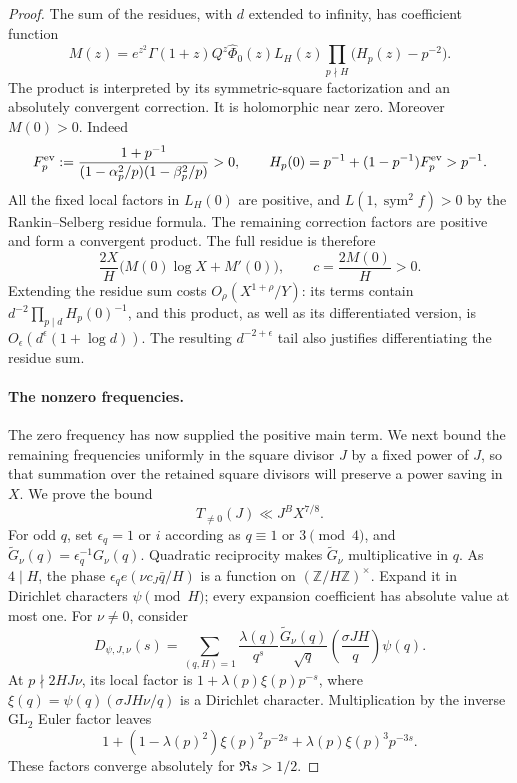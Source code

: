 \begin{proof}
The sum of the residues, with $d$ extended to infinity, has coefficient
function
\[
 M(z)=e^{z^2}\Gamma(1+z)Q^z\widehat\Phi_0(z)L_H(z)
              \prod_{p\nmid H}\bigl(H_p(z)-p^{-2}\bigr).
\]
The product is interpreted by its symmetric-square factorization and
an absolutely convergent correction.  It is holomorphic near zero.
Moreover $M(0)>0$.  Indeed
\[
 F_p^{\rm ev}:=\frac{1+p^{-1}}
 {(1-\alpha_p^2/p)(1-\beta_p^2/p)}>0,\qquad
 H_p(0)=p^{-1}+(1-p^{-1})F_p^{\rm ev}>p^{-1}.
\]
All the fixed local factors in $L_H(0)$ are positive, and
$L(1,\operatorname{sym}^2 f)>0$ by the Rankin--Selberg residue formula.
The remaining correction factors are positive and form a convergent
product.  The full residue is therefore
\begin{equation}\label{odd:residue}
 \frac{2X}{H}\bigl(M(0)\log X+M'(0)\bigr),
 \qquad c=\frac{2M(0)}H>0.
\end{equation}
Extending the residue sum costs $O_\rho(X^{1+\rho}/Y)$:
its terms contain $d^{-2}\prod_{p\mid d}H_p(0)^{-1}$, and this
product, as well as its differentiated version, is
$O_\epsilon(d^\epsilon(1+\log d))$.
The resulting $d^{-2+\epsilon}$ tail also justifies differentiating
the residue sum.

\paragraph{The nonzero frequencies.}
The zero frequency has now supplied the positive main term. We next
bound the remaining frequencies uniformly in the square divisor $J$
by a fixed power of $J$, so that summation over the retained square
divisors will preserve a power saving in $X$.
We prove the bound
\begin{equation}\label{odd:offdiagonal}
 T_{\ne0}(J)\ll J^B X^{7/8}.
\end{equation}
For odd $q$, set $\epsilon_q=1$ or $i$ according as $q\equiv1$ or
$3\pmod4$, and $\widetilde G_\nu(q)=\epsilon_q^{-1}G_\nu(q)$.
Quadratic reciprocity makes $\widetilde G_\nu$ multiplicative in $q$.
As $4\mid H$, the phase $\epsilon_q e(\nu c_J\bar q/H)$ is a
function on $(\mathbb Z/H\mathbb Z)^\times$.  Expand it in Dirichlet
characters $\psi\pmod H$; every expansion coefficient has absolute
value at most one.  For $\nu\ne0$, consider
\[
 D_{\psi,J,\nu}(s)=\sum_{(q,H)=1}
 \frac{\lambda(q)}{q^s}\frac{\widetilde G_\nu(q)}{\sqrt q}
                 \left(\frac{\sigma JH}{q}\right)\psi(q).
\]
At $p\nmid2HJ\nu$, its local factor is
$1+\lambda(p)\xi(p)p^{-s}$, where
$\xi(q)=\psi(q)(\sigma JH\nu/q)$ is a Dirichlet character.
Multiplication by the inverse $\mathrm{GL}_2$ Euler factor leaves
\[
 1+(1-\lambda(p)^2)\xi(p)^2p^{-2s}
     +\lambda(p)\xi(p)^3p^{-3s}.
\]
These factors converge absolutely for $\Re s>1/2$.


\end{proof}
